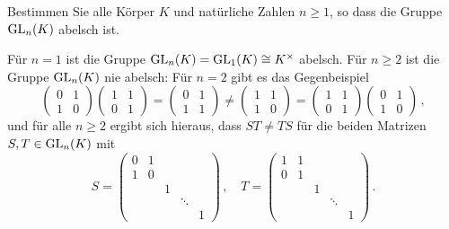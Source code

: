 \begin{question}[subtitle = {Zur Kommutativität von $\GL_n(K)$}]
  Bestimmen Sie alle Körper $K$ und natürliche Zahlen $n \geq 1$, so dass die Gruppe $\GL_n(K)$ abelsch ist.
\end{question}

\begin{solution}
  Für $n = 1$ ist die Gruppe $\operatorname{GL}_n(K) = \operatorname{GL}_1(K) \cong K^\times$ abelsch.
  Für $n \geq 2$ ist die Gruppe $\GL_n(K)$ nie abelsch:
  Für $n = 2$ gibt es das Gegenbeispiel
  \[
          \begin{pmatrix}
            0 & 1 \\
            1 & 0
          \end{pmatrix}
          \begin{pmatrix}
            1 & 1 \\
            0 & 1
          \end{pmatrix}
    =     \begin{pmatrix}
            0 & 1 \\
            1 & 1
          \end{pmatrix}
    \neq  \begin{pmatrix}
            1 & 1 \\
            1 & 0
          \end{pmatrix}
    =     \begin{pmatrix}
            1 & 1 \\
            0 & 1
          \end{pmatrix}
          \begin{pmatrix}
            0 & 1 \\
            1 & 0
          \end{pmatrix} \,,
  \]
  und für alle $n \geq 2$ ergibt sich hieraus, dass $ST \neq TS$ für die beiden Matrizen $S, T \in \operatorname{GL}_n(K)$ mit
  \[
      S
    = \begin{pmatrix}
        0 & 1 &   &         &   \\
        1 & 0 &   &         &   \\
          &   & 1 &         &   \\
          &   &   & \ddots  &   \\
          &   &   &         & 1
      \end{pmatrix} \,,
      \quad
      T
    = \begin{pmatrix}
        1 & 1 &   &         &   \\
        0 & 1 &   &         &   \\
          &   & 1 &         &   \\
          &   &   & \ddots  &   \\
          &   &   &         & 1
      \end{pmatrix} \,.
  \]
\end{solution}


